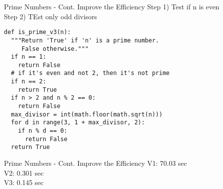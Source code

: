 \documentclass{beamer}
\begin{document}
\begin{frame}[fragile]{Prime Numbers - Cont. Improve the Efficiency}
\vspace{1em}
Step 1) Test if n is even\\
Step 2) TEst only odd divisors \vspace{-.5em}
\begin{verbatim}
def is_prime_v3(n):
  """Return 'True' if 'n' is a prime number.
     False otherwise."""
  if n == 1:
    return False
  # if it's even and not 2, then it's not prime
  if n == 2:
    return True
  if n > 2 and n % 2 == 0:
    return False
  max_divisor = int(math.floor(math.sqrt(n)))
  for d in range(3, 1 + max_divisor, 2):
    if n % d == 0:
      return False
  return True
\end{verbatim}
\end{frame}

\begin{frame}[fragile]{Prime Numbers - Cont. Improve the Efficiency}
V1: 70.03 sec\\
V2: 0.301 sec\\
V3: 0.145 sec\\
\begin{verbatim}

\end{verbatim}
\end{frame}
\end{document}
